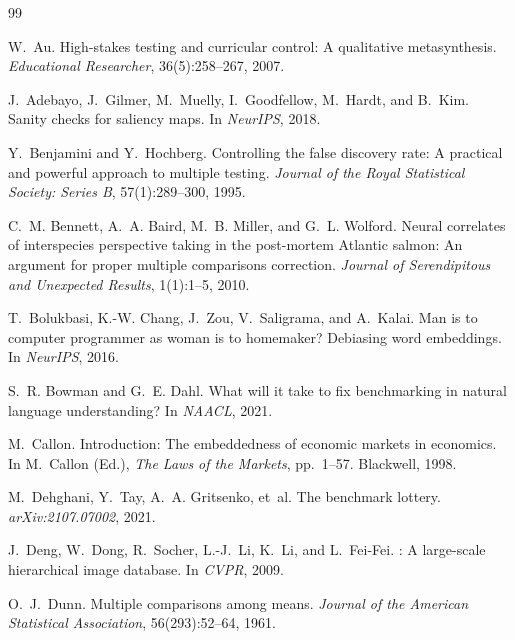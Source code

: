 \documentclass{article}
\begin{document}
\begin{thebibliography}{99}

W.~Au.
\newblock High-stakes testing and curricular control: A qualitative metasynthesis.
\newblock \emph{Educational Researcher}, 36(5):258--267, 2007.

J.~Adebayo, J.~Gilmer, M.~Muelly, I.~Goodfellow, M.~Hardt, and B.~Kim.
\newblock Sanity checks for saliency maps.
\newblock In \emph{NeurIPS}, 2018.

Y.~Benjamini and Y.~Hochberg.
\newblock Controlling the false discovery rate: A practical and powerful approach to multiple testing.
\newblock \emph{Journal of the Royal Statistical Society: Series B}, 57(1):289--300, 1995.

C.~M. Bennett, A.~A. Baird, M.~B. Miller, and G.~L. Wolford.
\newblock Neural correlates of interspecies perspective taking in the post-mortem {Atlantic} salmon: An argument for proper multiple comparisons correction.
\newblock \emph{Journal of Serendipitous and Unexpected Results}, 1(1):1--5, 2010.

T.~Bolukbasi, K.-W. Chang, J.~Zou, V.~Saligrama, and A.~Kalai.
\newblock Man is to computer programmer as woman is to homemaker? {Debiasing} word embeddings.
\newblock In \emph{NeurIPS}, 2016.

S.~R. Bowman and G.~E. Dahl.
\newblock What will it take to fix benchmarking in natural language understanding?
\newblock In \emph{NAACL}, 2021.

M.~Callon.
\newblock Introduction: The embeddedness of economic markets in economics.
\newblock In M.~Callon (Ed.), \emph{The Laws of the Markets}, pp.\ 1--57. Blackwell, 1998.

M.~Dehghani, Y.~Tay, A.~A. Gritsenko, et~al.
\newblock The benchmark lottery.
\newblock \emph{arXiv:2107.07002}, 2021.

J.~Deng, W.~Dong, R.~Socher, L.-J.~Li, K.~Li, and L.~Fei-Fei.
: A large-scale hierarchical image database.
\newblock In \emph{CVPR}, 2009.

O.~J.~Dunn.
\newblock Multiple comparisons among means.
\newblock \emph{Journal of the American Statistical Association}, 56(293):52--64, 1961.


\end{thebibliography}
\end{document}
